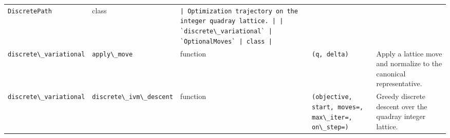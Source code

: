 \documentclass[
  10pt,
]{article}
\newcommand{\passthrough}[1]{#1}
\begin{document}
\begin{longtable}[]{@{}lllll@{}}
\begin{minipage}[t]{0.17\columnwidth}
\passthrough{\lstinline!DiscretePath!}\strut
\end{minipage} & \begin{minipage}[t]{0.17\columnwidth}\raggedright
class\strut
\end{minipage} & \begin{minipage}[t]{0.17\columnwidth}\raggedright
\passthrough{\lstinline!| Optimization trajectory on the integer quadray lattice. | | `discrete\_variational` | `OptionalMoves` | class |!}\strut
\end{minipage} & \begin{minipage}[t]{0.17\columnwidth}\raggedright
\strut
\end{minipage}\tabularnewline
\begin{minipage}[t]{0.17\columnwidth}\raggedright
\passthrough{\lstinline!discrete\_variational!}\strut
\end{minipage} & \begin{minipage}[t]{0.17\columnwidth}\raggedright
\passthrough{\lstinline!apply\_move!}\strut
\end{minipage} & \begin{minipage}[t]{0.17\columnwidth}\raggedright
function\strut
\end{minipage} & \begin{minipage}[t]{0.17\columnwidth}\raggedright
\passthrough{\lstinline!(q, delta)!}\strut
\end{minipage} & \begin{minipage}[t]{0.17\columnwidth}\raggedright
Apply a lattice move and normalize to the canonical
representative.\strut
\end{minipage}\tabularnewline
\begin{minipage}[t]{0.17\columnwidth}\raggedright
\passthrough{\lstinline!discrete\_variational!}\strut
\end{minipage} & \begin{minipage}[t]{0.17\columnwidth}\raggedright
\passthrough{\lstinline!discrete\_ivm\_descent!}\strut
\end{minipage} & \begin{minipage}[t]{0.17\columnwidth}\raggedright
function\strut
\end{minipage} & \begin{minipage}[t]{0.17\columnwidth}\raggedright
\passthrough{\lstinline!(objective, start, moves=, max\_iter=, on\_step=)!}\strut
\end{minipage} & \begin{minipage}[t]{0.17\columnwidth}\raggedright
Greedy discrete descent over the quadray integer lattice.\strut

\end{minipage}
\end{longtable}
\end{document}
